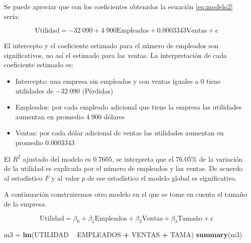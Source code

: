 \documentclass[letterpaper,]{book}
\newenvironment{Shaded}{\begin{snugshade}}{\end{snugshade}}
\newcommand{\KeywordTok}[1]{\textcolor[rgb]{0.13,0.29,0.53}{\textbf{#1}}}
\newcommand{\NormalTok}[1]{#1}
\newcommand{\OperatorTok}[1]{\textcolor[rgb]{0.81,0.36,0.00}{\textbf{#1}}}
\newcommand{\StringTok}[1]{\textcolor[rgb]{0.31,0.60,0.02}{#1}}
\providecommand{\tightlist}{%
  \setlength{\itemsep}{0pt}\setlength{\parskip}{0pt}}
\begin{document}
Se puede apreciar que con los coeficientes obtenidos la ecuación \eqref{eq:modelo2} sería:

\begin{equation}
  \text{Utilidad} = -32\;090 + 4\;900 \text{Empleados} + 0.0003343 \text{Ventas} + \epsilon
    \label{eq:modelo3}
\end{equation}

El intercepto y el coeficiente estimado para el número de empleados son significativos, no así el estimado para las ventas. La interpretación de cada coeficiente estimado es:

\begin{itemize}
\tightlist
\item
  Intercepto: una empresa sin empleados y con ventas iguales a 0 tiene utilidades de \(-32\;090\) (Pérdidas)
\item
  Empleados: por cada empleado adicional que tiene la empresa las utilidades aumentan en promedio \(4\;900\) dólares
\item
  Ventas: por cada dólar adicional de ventas las utilidades aumentan en promedio \(0.0003343\)
\end{itemize}

El \(R^2\) ajustado del modelo es \(0.7605\), se interpreta que el \(76.05\)\% de la variación de la utilidad es explicada por el número de empleados y las ventas. De acuerdo al estadístico \(F\) y al valor \(p\) de ese estadístico el modelo global es significativo.

A continuación construiremos otro modelo en el que se tome en cuenta el tamaño de la empresa.

\begin{equation}
  \text{Utilidad} = \beta_0 + \beta_1 \text{Empleados} + \beta_2 \text{Ventas} + \beta_3 \text{Tamaño} + \epsilon
    \label{eq:modelo4}
\end{equation}

\begin{Shaded}
\begin{Highlighting}[]
\NormalTok{m3 =}\StringTok{ }\KeywordTok{lm}\NormalTok{(UTILIDAD }\OperatorTok{~}\StringTok{ }\NormalTok{EMPLEADOS }\OperatorTok{+}\StringTok{ }\NormalTok{VENTAS }\OperatorTok{+}\StringTok{ }\NormalTok{TAMA)}
\KeywordTok{summary}\NormalTok{(m3)}
\end{Highlighting}
\end{Shaded}
\end{document}
